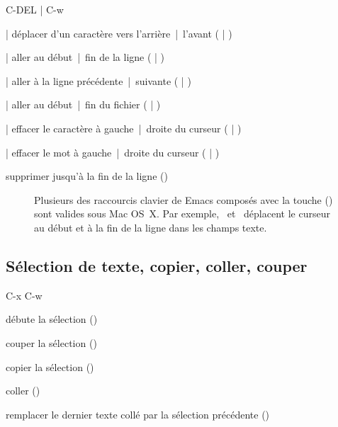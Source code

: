 \begin{ttscript}{C-DEL | C-w}
  \raggedright
\item[\emacs{C-b} | \emacs{C-f}] déplacer d'un caractère vers l'arrière~|~l'avant
  ( | )
\item[\emacs{C-a} | \emacs{C-e}] aller au début~|~fin de la ligne
  ( | )
\item[\emacs{C-p} | \emacs{C-n}] aller à la ligne précédente~|~suivante
  ( | )
\item[\emacs{M-<} | \emacs{M->}] aller au début~|~fin du fichier
  ( | ) \\[\baselineskip]
\item[\emacs{DEL} | \emacs{C-d}] effacer le caractère à
  gauche~|~droite du curseur ( | )
\item[\emacs{M-DEL} | \emacs{M-d}] effacer le mot à gauche~|~droite
  du curseur ( | )
\item[\emacs{C-k}] supprimer jusqu'à la fin de la ligne ()
\end{ttscript}

\begin{figure}[ht]
  \begin{osx}
    Plusieurs des raccourcis clavier de Emacs composés avec la touche
     (\ctlkey) sont valides sous Mac OS~X. Par exemple,
    \ctlkey\, et \ctlkey\, déplacent le curseur au
    début et à la fin de la ligne dans les champs texte.
  \end{osx}
\end{figure}


\subsection{Sélection de texte, copier, coller, couper}
\label{emacs+ess:commandes:selection}

\begin{ttscript}{C-x C-w}
  \raggedright
\item[\emacs{C-SPC}] débute la sélection ()
\item[\emacs{C-w}] couper la sélection ()
\item[\emacs{M-w}] copier la sélection ()
\item[\emacs{C-y}] coller ()
\item[\emacs{M-y}] remplacer le dernier texte collé par la
  sélection précédente ()
\end{ttscript}

